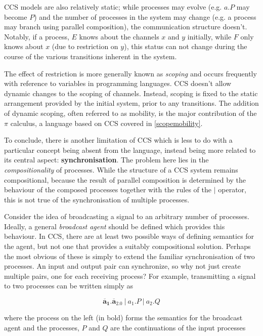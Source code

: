 CCS models are also relatively static; while processes may evolve
(e.g. $a.P$ may become $P$) and the number of processes in the system
may change (e.g. a process may branch using parallel composition), the
communication structure doesn't.  Notably, if a process, $E$ knows
about the channels $x$ and $y$ initially, while $F$ only knows about
$x$ (due to restriction on $y$), this status can not change during the
course of the various transitions inherent in the system.

The effect of restriction is more generally known as \emph{scoping}
and occurs frequently with reference to variables in programming
languages.  CCS doesn't allow dynamic changes to the scoping of
channels.  Instead, scoping is fixed to the static arrangement
provided by the initial system, prior to any transitions.  The
addition of dynamic scoping, often referred to as mobility, is the
major contribution of the $\pi$ calculus, a language based on CCS
covered in \ref{scopemobility}.

To conclude, there is another limitation of CCS which is less to do
with a particular concept being absent from the language, instead
being more related to its central aspect: \textbf{synchronisation}.
The problem here lies in the \emph{compositionality} of processes.
While the structure of a CCS system remains compositional, because the
result of parallel composition is determined by the behaviour of the
composed processes together with the rules of the $|$ operator, this
is not true of the synchronisation of multiple processes.

Consider the idea of broadcasting a signal to an arbitrary number of
processes.  Ideally, a general \emph{broadcast agent} should be
defined which provides this behaviour.  In CCS, there are at least two
possible ways of defining semantics for the agent, but not one that
provides a suitably compositional solution.  Perhaps the most obvious
of these is simply to extend the familiar synchronisation of two
processes.  An input and output pair can synchronize, so why not just
create multiple pairs, one for each receiving process?  For example,
transmitting a signal to two processes can be written simply as

\begin{equation}
\mathbf{\overline{a}_1.\overline{a}_2.0}\ |\ a_1.P\ |\ a_2.Q
\end{equation}

\noindent where the process on the left (in bold) forms the semantics
for the broadcast agent and the processes, $P$ and $Q$ are the
continuations of the input processes

